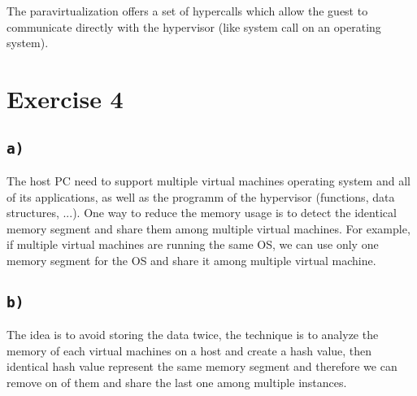 \documentclass[a4paper,11pt]{report}
\begin{document}
 The paravirtualization offers a set of hypercalls which allow the guest to
 communicate directly with the hypervisor (like system call on an operating
 system).

\section*{Exercise 4}

\subsection*{\texttt{a)}}

The host PC need to support multiple virtual machines operating system and all
of its applications, as well as the programm of the hypervisor (functions, data
structures, ...). One way to reduce the memory usage is to detect the identical
memory segment and share them among multiple virtual machines. For example, if
multiple virtual machines are running the same OS, we can use only one memory
segment for the OS and share it among multiple virtual machine.

\subsection*{\texttt{b)}}

The idea is to avoid storing the data twice, the technique is to analyze the
memory of each virtual machines on a host and create a hash value, then
identical hash value represent the same memory segment and therefore we can
remove on of them and share the last one among multiple instances.
\end{document}
